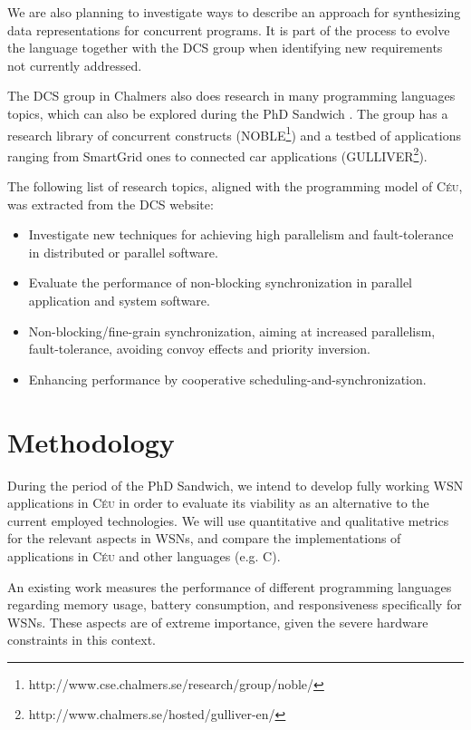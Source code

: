 \documentclass[pdftex,12pt,a4paper]{article}
\newcommand{\CEU}{\textsc{C\'{e}u}}
\begin{document}
We are also planning to investigate ways to describe an approach for 
synthesizing data representations for concurrent programs.
It is part of the process to evolve the language together with the DCS group 
when identifying new requirements not currently addressed.

The DCS group in Chalmers also does research in many programming languages 
topics, which can also be explored during the PhD Sandwich 
\cite{dcs.lock_free,dcs.transactional,dcs.manycore}.
The group has a research library of concurrent constructs 
(NOBLE\footnote{http://www.cse.chalmers.se/research/group/noble/}) and a 
testbed of applications ranging from SmartGrid ones to connected car 
applications (GULLIVER\footnote{http://www.chalmers.se/hosted/gulliver-en/}).

The following list of research topics, aligned with the programming model of 
\CEU{}, was extracted from the DCS website:

\begin{itemize}
\item Investigate new techniques for achieving high parallelism and 
      fault-tolerance in distributed or parallel software.
\item Evaluate the performance of non-blocking synchronization in parallel 
      application and system software.
\item Non-blocking/fine-grain synchronization, aiming at increased parallelism, 
      fault-tolerance, avoiding convoy effects and priority inversion.
\item Enhancing performance by cooperative scheduling-and-synchronization.
\end{itemize}

\section{Methodology}

During the period of the PhD Sandwich, we intend to develop fully working WSN 
applications in \CEU{} in order to evaluate its viability as an
alternative to the current employed technologies.
We will use quantitative and qualitative metrics for the relevant aspects in
WSNs, and compare the implementations of applications in \CEU{} and other 
languages (e.g. C).

An existing work \cite{wsn.comparison} measures the performance of different 
programming languages regarding memory usage, battery
consumption, and responsiveness specifically for WSNs.
These aspects are of extreme importance, given the severe hardware constraints 
in this context.
\end{document}
